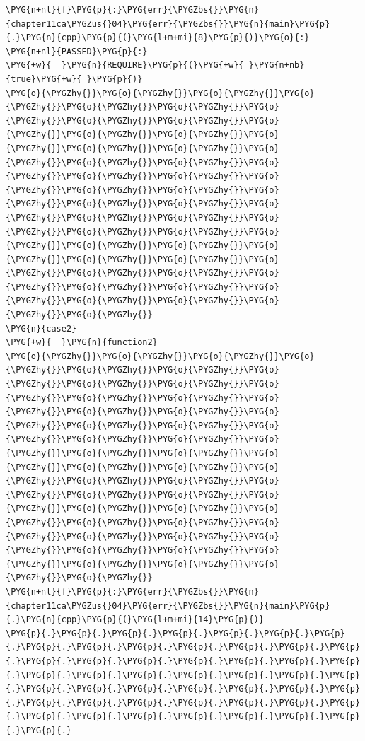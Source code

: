 \begin{itemize}
\begin{codeblockbg}
\begin{Verbatim}[commandchars=\\\{\},breaklines=true,breakanywhere=true,fontsize=\codefont,xleftmargin=17bp]
\PYG{n+nl}{f}\PYG{p}{:}\PYG{err}{\PYGZbs{}}\PYG{n}{chapter11ca\PYGZus{}04}\PYG{err}{\PYGZbs{}}\PYG{n}{main}\PYG{p}{.}\PYG{n}{cpp}\PYG{p}{(}\PYG{l+m+mi}{8}\PYG{p}{)}\PYG{o}{:}
\PYG{n+nl}{PASSED}\PYG{p}{:}
\PYG{+w}{  }\PYG{n}{REQUIRE}\PYG{p}{(}\PYG{+w}{ }\PYG{n+nb}{true}\PYG{+w}{ }\PYG{p}{)}
\PYG{o}{\PYGZhy{}}\PYG{o}{\PYGZhy{}}\PYG{o}{\PYGZhy{}}\PYG{o}{\PYGZhy{}}\PYG{o}{\PYGZhy{}}\PYG{o}{\PYGZhy{}}\PYG{o}{\PYGZhy{}}\PYG{o}{\PYGZhy{}}\PYG{o}{\PYGZhy{}}\PYG{o}{\PYGZhy{}}\PYG{o}{\PYGZhy{}}\PYG{o}{\PYGZhy{}}\PYG{o}{\PYGZhy{}}\PYG{o}{\PYGZhy{}}\PYG{o}{\PYGZhy{}}\PYG{o}{\PYGZhy{}}\PYG{o}{\PYGZhy{}}\PYG{o}{\PYGZhy{}}\PYG{o}{\PYGZhy{}}\PYG{o}{\PYGZhy{}}\PYG{o}{\PYGZhy{}}\PYG{o}{\PYGZhy{}}\PYG{o}{\PYGZhy{}}\PYG{o}{\PYGZhy{}}\PYG{o}{\PYGZhy{}}\PYG{o}{\PYGZhy{}}\PYG{o}{\PYGZhy{}}\PYG{o}{\PYGZhy{}}\PYG{o}{\PYGZhy{}}\PYG{o}{\PYGZhy{}}\PYG{o}{\PYGZhy{}}\PYG{o}{\PYGZhy{}}\PYG{o}{\PYGZhy{}}\PYG{o}{\PYGZhy{}}\PYG{o}{\PYGZhy{}}\PYG{o}{\PYGZhy{}}\PYG{o}{\PYGZhy{}}\PYG{o}{\PYGZhy{}}\PYG{o}{\PYGZhy{}}\PYG{o}{\PYGZhy{}}\PYG{o}{\PYGZhy{}}\PYG{o}{\PYGZhy{}}\PYG{o}{\PYGZhy{}}\PYG{o}{\PYGZhy{}}\PYG{o}{\PYGZhy{}}\PYG{o}{\PYGZhy{}}\PYG{o}{\PYGZhy{}}\PYG{o}{\PYGZhy{}}\PYG{o}{\PYGZhy{}}\PYG{o}{\PYGZhy{}}
\PYG{n}{case2}
\PYG{+w}{  }\PYG{n}{function2}
\PYG{o}{\PYGZhy{}}\PYG{o}{\PYGZhy{}}\PYG{o}{\PYGZhy{}}\PYG{o}{\PYGZhy{}}\PYG{o}{\PYGZhy{}}\PYG{o}{\PYGZhy{}}\PYG{o}{\PYGZhy{}}\PYG{o}{\PYGZhy{}}\PYG{o}{\PYGZhy{}}\PYG{o}{\PYGZhy{}}\PYG{o}{\PYGZhy{}}\PYG{o}{\PYGZhy{}}\PYG{o}{\PYGZhy{}}\PYG{o}{\PYGZhy{}}\PYG{o}{\PYGZhy{}}\PYG{o}{\PYGZhy{}}\PYG{o}{\PYGZhy{}}\PYG{o}{\PYGZhy{}}\PYG{o}{\PYGZhy{}}\PYG{o}{\PYGZhy{}}\PYG{o}{\PYGZhy{}}\PYG{o}{\PYGZhy{}}\PYG{o}{\PYGZhy{}}\PYG{o}{\PYGZhy{}}\PYG{o}{\PYGZhy{}}\PYG{o}{\PYGZhy{}}\PYG{o}{\PYGZhy{}}\PYG{o}{\PYGZhy{}}\PYG{o}{\PYGZhy{}}\PYG{o}{\PYGZhy{}}\PYG{o}{\PYGZhy{}}\PYG{o}{\PYGZhy{}}\PYG{o}{\PYGZhy{}}\PYG{o}{\PYGZhy{}}\PYG{o}{\PYGZhy{}}\PYG{o}{\PYGZhy{}}\PYG{o}{\PYGZhy{}}\PYG{o}{\PYGZhy{}}\PYG{o}{\PYGZhy{}}\PYG{o}{\PYGZhy{}}\PYG{o}{\PYGZhy{}}\PYG{o}{\PYGZhy{}}\PYG{o}{\PYGZhy{}}\PYG{o}{\PYGZhy{}}\PYG{o}{\PYGZhy{}}\PYG{o}{\PYGZhy{}}\PYG{o}{\PYGZhy{}}\PYG{o}{\PYGZhy{}}\PYG{o}{\PYGZhy{}}\PYG{o}{\PYGZhy{}}
\PYG{n+nl}{f}\PYG{p}{:}\PYG{err}{\PYGZbs{}}\PYG{n}{chapter11ca\PYGZus{}04}\PYG{err}{\PYGZbs{}}\PYG{n}{main}\PYG{p}{.}\PYG{n}{cpp}\PYG{p}{(}\PYG{l+m+mi}{14}\PYG{p}{)}
\PYG{p}{.}\PYG{p}{.}\PYG{p}{.}\PYG{p}{.}\PYG{p}{.}\PYG{p}{.}\PYG{p}{.}\PYG{p}{.}\PYG{p}{.}\PYG{p}{.}\PYG{p}{.}\PYG{p}{.}\PYG{p}{.}\PYG{p}{.}\PYG{p}{.}\PYG{p}{.}\PYG{p}{.}\PYG{p}{.}\PYG{p}{.}\PYG{p}{.}\PYG{p}{.}\PYG{p}{.}\PYG{p}{.}\PYG{p}{.}\PYG{p}{.}\PYG{p}{.}\PYG{p}{.}\PYG{p}{.}\PYG{p}{.}\PYG{p}{.}\PYG{p}{.}\PYG{p}{.}\PYG{p}{.}\PYG{p}{.}\PYG{p}{.}\PYG{p}{.}\PYG{p}{.}\PYG{p}{.}\PYG{p}{.}\PYG{p}{.}\PYG{p}{.}\PYG{p}{.}\PYG{p}{.}\PYG{p}{.}\PYG{p}{.}\PYG{p}{.}\PYG{p}{.}\PYG{p}{.}\PYG{p}{.}\PYG{p}{.}

\end{Verbatim}
\end{codeblockbg}
\end{itemize}
